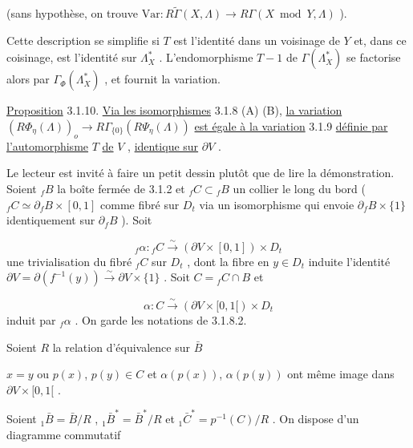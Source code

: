 
 (sans hypothèse, on trouve $\mathrm{Var} : R\widetilde{\Gamma} (X, \Lambda) \longrightarrow R\Gamma (X \bmod Y, \Lambda)$ ).

Cette description se simplifie si $T$ est l'identité dans un voisinage de $Y$ et, dans ce coisinage, est l'identité sur $\Lambda^*_X$ . L'endomorphisme $T-1$ de $\Gamma (\Lambda^*_X)$ se factorise alors par $\Gamma_\Phi(\Lambda^*_X)$ , et fournit la variation.

\underline{Proposition} 3.1.10. \underline{Via les isomorphismes} 3.1.8 (A) (B), \underline{la variation} $(R\Phi_\eta(\Lambda))_o \to R\Gamma_{\{0\}}(R\Psi_\eta(\Lambda))$ \underline{est égale à la variation} 3.1.9 \underline{définie par l'automorphisme} $T$ \underline{de} $V$ , \underline{identique sur} $\partial V$ .

Le lecteur est invité à faire un petit dessin plutôt que de lire la démonstration. Soient ${}_fB$ la boîte fermée de 3.1.2 et ${}_fC \subset {}_fB$ un collier le long du bord ( ${}_fC \simeq \partial_fB \times [0, 1]$ comme fibré sur $D_t$ via un isomorphisme qui envoie $\partial_fB \times \{1\}$ identiquement sur $\partial_fB$ ). Soit

\begin{equation*}
{}_f\alpha : {}_fC \overset{\sim}{\longrightarrow} (\partial V \times [0,1]) \times D_t
\end{equation*}
une trivialisation du fibré ${}_fC$ sur $D_t$ , dont la fibre en $y \in D_t$ induite l'identité $\partial V = \partial(f^{-1}(y)) \overset{\sim}{\longrightarrow} \partial V \times \{1\}$ . Soit $C = {}_fC \cap B$ et

\begin{equation*}
\alpha : C \overset{\sim}{\longrightarrow} (\partial V \times [0,1[) \times D_t
\end{equation*}
induit par ${}_f\alpha$ . On garde les notations de 3.1.8.2.

Soient $R$ la relation d'équivalence sur $\bar{B}$

$x = y$ ou $p(x)$, $p(y) \in C$ et $\alpha(p(x))$, $\alpha(p(y))$ ont même image dans $\partial V \times [0,1[$ .

Soient ${}_1\bar{B} = \bar{B}/R$ , ${}_1\bar{B}^* = \bar{B}^*/R$ et ${}_1\bar{C}^* = p^{-1}(C)/R$ . On dispose d'un diagramme commutatif 



